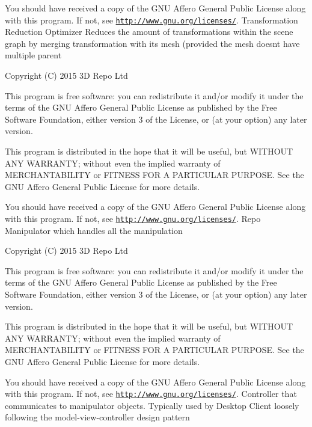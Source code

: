 You should have received a copy of the G\+N\+U Affero General Public License along with this program. If not, see \href{http://www.gnu.org/licenses/}{\tt http\+://www.\+gnu.\+org/licenses/}. Transformation Reduction Optimizer Reduces the amount of transformations within the scene graph by merging transformation with its mesh (provided the mesh doesn\textquotesingle{}t have multiple parent

Copyright (C) 2015 3\+D Repo Ltd

This program is free software\+: you can redistribute it and/or modify it under the terms of the G\+N\+U Affero General Public License as published by the Free Software Foundation, either version 3 of the License, or (at your option) any later version.

This program is distributed in the hope that it will be useful, but W\+I\+T\+H\+O\+U\+T A\+N\+Y W\+A\+R\+R\+A\+N\+T\+Y; without even the implied warranty of M\+E\+R\+C\+H\+A\+N\+T\+A\+B\+I\+L\+I\+T\+Y or F\+I\+T\+N\+E\+S\+S F\+O\+R A P\+A\+R\+T\+I\+C\+U\+L\+A\+R P\+U\+R\+P\+O\+S\+E. See the G\+N\+U Affero General Public License for more details.

You should have received a copy of the G\+N\+U Affero General Public License along with this program. If not, see \href{http://www.gnu.org/licenses/}{\tt http\+://www.\+gnu.\+org/licenses/}. Repo Manipulator which handles all the manipulation

Copyright (C) 2015 3\+D Repo Ltd

This program is free software\+: you can redistribute it and/or modify it under the terms of the G\+N\+U Affero General Public License as published by the Free Software Foundation, either version 3 of the License, or (at your option) any later version.

This program is distributed in the hope that it will be useful, but W\+I\+T\+H\+O\+U\+T A\+N\+Y W\+A\+R\+R\+A\+N\+T\+Y; without even the implied warranty of M\+E\+R\+C\+H\+A\+N\+T\+A\+B\+I\+L\+I\+T\+Y or F\+I\+T\+N\+E\+S\+S F\+O\+R A P\+A\+R\+T\+I\+C\+U\+L\+A\+R P\+U\+R\+P\+O\+S\+E. See the G\+N\+U Affero General Public License for more details.

You should have received a copy of the G\+N\+U Affero General Public License along with this program. If not, see \href{http://www.gnu.org/licenses/}{\tt http\+://www.\+gnu.\+org/licenses/}. Controller that communicates to manipulator objects. Typically used by Desktop Client loosely following the model-\/view-\/controller design pattern 